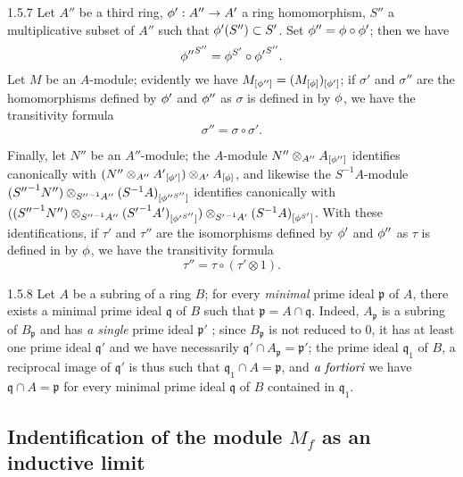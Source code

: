 \documentclass[10pt,oneside]{book}
\begin{document}
\begin{env}{1.5.7}
\label{env-0.1.5.7}
Let $A''$ be a third ring, $\phi':A''\to A'$ a ring homomorphism, $S''$ a multiplicative
subset of $A''$ such that $\phi'(S'')\subset S'$. Set $\phi''=\phi\circ\phi'$; then we
have
\[
  {\phi''}^{S''}=\phi^{S'}\circ{\phi'}^{S''}.
\]
Let $M$ be an $A$-module; evidently we have $M_{[\phi'']}=(M_{[\phi]})_{[\phi']}$;
if $\sigma'$ and $\sigma''$ are the homomorphisms defined by $\phi'$ and $\phi''$ as
$\sigma$ is defined in  by $\phi$, we have the transitivity formula
\[
  \sigma''=\sigma\circ\sigma'.
\]

Finally, let $N''$ be an $A''$-module; the $A$-module $N''\otimes_{A''}A_{[\phi'']}$
identifies canonically with $(N''\otimes_{A''}{A'}_{[\phi']})\otimes_{A'}A_{[\phi]}$,
and likewise the $S^{-1}A$-module
${({S''}^{-1}N'')\otimes_{{S''}^{-1}A''}(S^{-1}A)_{[{\phi''}^{S''}]}}$ identifies
canonically with
$(({S''}^{-1}N'')\otimes_{{S''}^{-1}A''}({S'}^{-1}A')_{[{\phi'}^{S''}]})
  \otimes_{{S'}^{-1}A'}(S^{-1}A)_{[\phi^{S'}]}$. With these identifications, if $\tau'$
and $\tau''$ are the isomorphisms defined by $\phi'$ and $\phi''$ as $\tau$ is defined
in  by $\phi$, we have the transitivity formula
\[
  \tau''=\tau\circ(\tau'\otimes 1).
\]
\end{env}

\begin{env}{1.5.8}
\label{env-0.1.5.8}
Let $A$ be a subring of a ring $B$; for every \emph{minimal} prime ideal $\mathfrak{p}$ of
$A$, there exists a minimal prime ideal $\mathfrak{q}$ of $B$ such that
$\mathfrak{p}=A\cap\mathfrak{q}$. Indeed, $A_\mathfrak{p}$ is a subring of $B_\mathfrak{p}$
 and has \emph{a single} prime ideal $\mathfrak{p}'$ ;
since $B_\mathfrak{p}$ is not reduced to $0$, it has at least one prime ideal $\mathfrak{q}'$
and we have necessarily $\mathfrak{q}'\cap A_\mathfrak{p}=\mathfrak{p}'$; the prime ideal
$\mathfrak{q}_1$ of $B$, a reciprocal image of $\mathfrak{q}'$ is thus such that
$\mathfrak{q}_1\cap A=\mathfrak{p}$, and $\emph{a fortiori}$ we have
$\mathfrak{q}\cap A=\mathfrak{p}$ for every minimal prime ideal $\mathfrak{q}$ of $B$
contained in $\mathfrak{q}_1$.
\end{env}

\subsection{Indentification of the module $M_f$ as an inductive limit}
\label{0-prelim-1.6}
\end{document}
